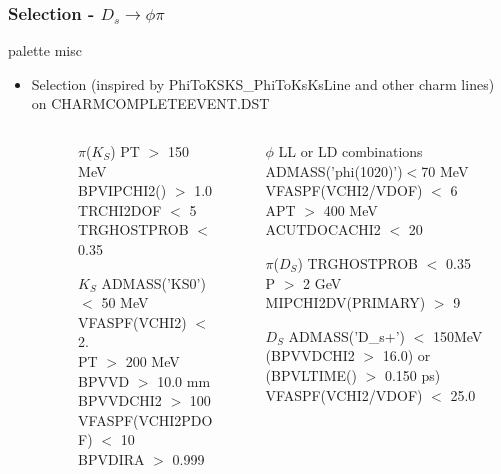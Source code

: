 \documentclass{beamer}
\begin{document}
\LogoOff
\begin{frame}[fragile]
\frametitle{Selection - $D_s \rightarrow \phi \pi$}
\vspace*{-2mm}
\begin{beamercolorbox}[rounded=true,shadow=true]{palette misc}
\vspace*{-3mm}
\begin{itemize}
\item Selection (inspired by PhiToKSKS_PhiToKsKsLine and other charm lines) on CHARMCOMPLETEEVENT.DST

\begin{columns}
\begin{column}{.01\textwidth}
$\frac{}{}$
\end{column}
\begin{column}{.46\textwidth}
\vspace*{-.3mm}
\begin{itemize}
\item[$\pi$($K_S$)]
PT $>$ 150 MeV\\
BPVIPCHI2() $>$ 1.0\\
TRCHI2DOF $<$ 5\\
TRGHOSTPROB $<$ 0.35\\
\item[$K_S$] ADMASS('KS0') $<$ 50 MeV\\
VFASPF(VCHI2) $<$ 2.\\
PT $>$ 200 MeV\\
BPVVD $>$ 10.0 mm\\
BPVVDCHI2 $>$ 100\\
VFASPF(VCHI2PDOF) $<$ 10\\
BPVDIRA $>$ 0.999\\
\end{itemize}


\end{column}
\begin{column}{.48\textwidth}
\begin{itemize}
\item[$\phi$]LL or LD combinations\\
ADMASS('phi(1020)')$<$70 MeV\\
VFASPF(VCHI2/VDOF) $<$ 6\\
APT $>$ 400 MeV\\
ACUTDOCACHI2 $<$ 20 \\
\item[$\pi$($D_S$)]TRGHOSTPROB $<$ 0.35\\
P $>$ 2 GeV\\
MIPCHI2DV(PRIMARY) $>$ 9 \\
\item[$D_S$]ADMASS('D_s+') $<$ 150MeV\\
(BPVVDCHI2 $>$ 16.0) or (BPVLTIME() $>$ 0.150 ps)\\
VFASPF(VCHI2/VDOF) $<$ 25.0\\
\end{itemize}


\end{column}
\end{columns}
\end{itemize}
\end{beamercolorbox}
\end{frame}
\end{document}
